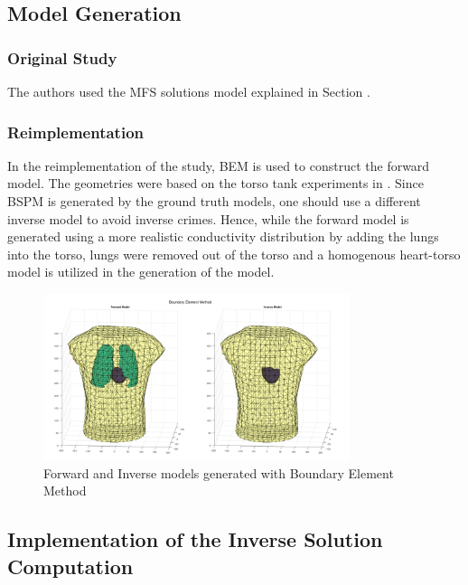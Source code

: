 \documentclass[draftcls, onecolumn, journal]{IEEEtran}
\begin{document}
\subsection{Model Generation} \label{subsec:modelgeneration}

\subsubsection{Original Study}

The authors used the MFS solutions model explained in Section .

\subsubsection{Reimplementation}\label{subsec:modelreimplement}

In the reimplementation of the study, BEM is used to construct the forward model. The geometries were based on the torso tank experiments in \cite{macleod1995electrocardiographic}. Since BSPM is generated by the ground truth models, one should use a different inverse model to avoid inverse crimes. Hence, while the forward model is generated using a more realistic conductivity distribution by adding the lungs into the torso, lungs were removed out of the torso and a homogenous heart-torso model is utilized in the generation of the model. 

\begin{figure}[h!]
    \centering
    \includegraphics[width=0.8\textwidth]{../images/BEM.png}
    \caption{Forward and Inverse models generated with Boundary Element Method}\label{fig:mylabel}
\end{figure}
    
\subsection{Implementation of the Inverse Solution Computation}
\end{document}
